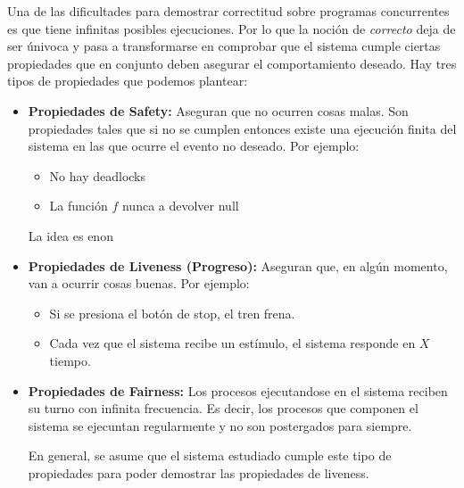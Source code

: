\vspace*{.5cm}
Una de las dificultades para demostrar correctitud sobre 
programas concurrentes es que tiene infinitas posibles ejecuciones. Por lo que la noción de \textit{correcto} deja de ser únivoca y pasa a transformarse en comprobar que el sistema cumple ciertas propiedades que en conjunto deben asegurar el comportamiento deseado. Hay tres tipos de propiedades que podemos plantear: 

\begin{itemize}
	\item \textbf{Propiedades de Safety:} Aseguran que no ocurren cosas malas. Son propiedades tales que si no se cumplen entonces existe una ejecución finita del sistema en las que ocurre el evento no deseado. Por ejemplo:
	\begin{itemize}
		\item No hay deadlocks
		\item La función $f$ nunca a devolver null
	\end{itemize}
	La idea es enon
	\item \textbf{Propiedades de Liveness (Progreso):} Aseguran que, en algún momento, van a ocurrir cosas buenas. Por ejemplo:
	\begin{itemize}
		\item Si se presiona el botón de stop, el tren frena.
		\item Cada vez que el sistema recibe un estímulo, el sistema responde en $X$ tiempo.
	\end{itemize}
	\item \textbf{Propiedades de Fairness:} Los procesos ejecutandose en el sistema reciben su turno con infinita frecuencia. Es decir, los procesos que componen el sistema se ejecuntan regularmente y no son postergados para siempre.
	
	En general, se asume que el sistema estudiado cumple este tipo de propiedades para poder demostrar las propiedades de liveness.
\end{itemize}

